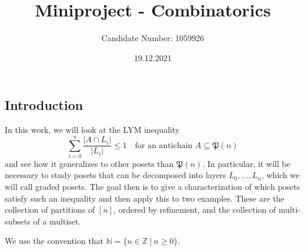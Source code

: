 \documentclass{scrartcl}
\title{Miniproject - Combinatorics}
\author{Candidate Number: 1059926}
\date{19.12.2021}
\newcommand{\N}{\mathbb{N}}
\newcommand{\Z}{\mathbb{Z}}
\newcommand{\powerset}{\mathfrak{P}}
\theoremstyle{definition}
\begin{document}
\maketitle

\subsection*{Introduction}
In this work, we will look at the LYM inequality
\begin{equation*}
    \sum_{i = 0}^n \frac {|A \cap L_i|} {|L_i|} \leq 1 \quad \text{for an antichain $A \subseteq \powerset(n)$}
\end{equation*}
and see how it generalizes to other posets than $\powerset(n)$.
In particular, it will be necessary to study posets that can be decomposed into layers $L_0, ..., L_n$, which we will call graded posets.
The goal then is to give a characterization of which posets satisfy such an inequality and then apply this to two examples.
These are the collection of partitions of $[n]$, ordered by refinement, and the collection of multi-subsets of a multiset.

We use the convention that $\N = \{ n \in \Z \ | \ n \geq 0 \}$.
\end{document}
